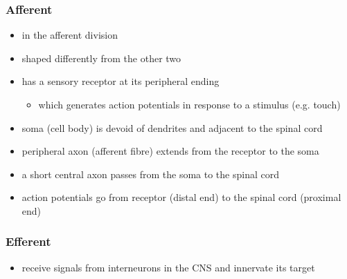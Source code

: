 \documentclass[10pt]{article}
\begin{document}
\subsubsection*{Afferent}
\begin{itemize}
    \item in the afferent division
    \item shaped differently from the other two
    \item has a sensory receptor at its peripheral ending 
        \begin{itemize}
            \item which generates action potentials in response to a stimulus (e.g. touch)
        \end{itemize}
    \item soma (cell body) is devoid of dendrites and adjacent to the spinal cord 
    \item peripheral axon (afferent fibre) extends from the receptor to the soma
    \item a short central axon passes from the soma to the spinal cord 
    \item action potentials go from receptor (distal end) to the spinal cord (proximal end)
\end{itemize}
\subsubsection*{Efferent}
\begin{itemize}
    \item receive signals from interneurons in the CNS and innervate its target
\end{itemize}
\end{document}

